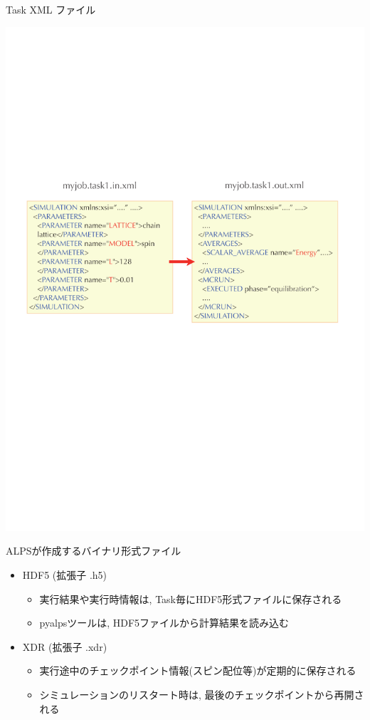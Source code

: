 \begin{frame}{Task XML ファイル}
  \begin{center}
    \includegraphics[height=.6\textheight]{simulation3.pdf}
  \end{center}
\end{frame}

\begin{frame}{ALPSが作成するバイナリ形式ファイル}
  \begin{itemize}
    \setlength{\itemsep}{1em}
  \item HDF5 (拡張子 {.h5})
    \begin{itemize}
    \item 実行結果や実行時情報は, Task毎にHDF5形式ファイルに保存される
    \item pyalpsツールは, HDF5ファイルから計算結果を読み込む
    \end{itemize}
  \item XDR (拡張子 {.xdr})
    \begin{itemize}
    \item 実行途中のチェックポイント情報(スピン配位等)が定期的に保存される
    \item シミュレーションのリスタート時は, 最後のチェックポイントから再開される
    \end{itemize}
  \end{itemize}
\end{frame}

